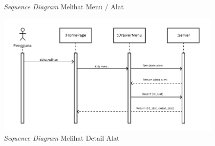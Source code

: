 \begin{flushleft}
\begin{justify}
\begin{enumerate}[label=\alph*.]
\begin{figure}[ht]
                \caption{\textit{Sequence Diagram} Melihat Menu / Alat}
            \end{figure}
            \vspace{5cm}
            \begin{figure}[ht]
                \centering
                \includegraphics[width=14cm]{images/bab 4/Sequence buka detail alat.png}
                \caption{\textit{Sequence Diagram} Melihat Detail Alat}
            \end{figure}


\end{enumerate}
\end{justify}
\end{flushleft}
